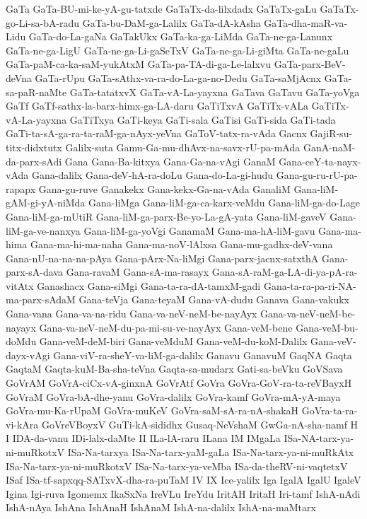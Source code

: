 {GaTa
GaTa-BU-mi-ke-yA-gu-tatxde
GaTaTx-da-lilxdadx
GaTaTx-gaLu
GaTaTx-go-Li-sa-bA-radu
GaTa-bu-DaM-ga-Lalilx
GaTa-dA-kAsha
GaTa-dha-maR-va-Lidu
GaTa-do-La-gaNa
GaTakUkx
GaTa-ka-ga-LiMda
GaTa-ne-ga-Lanunx
GaTa-ne-ga-LigU
GaTa-ne-ga-Li-gaSeTxV
GaTa-ne-ga-Li-giMta
GaTa-ne-gaLu
GaTa-paM-ca-ka-saM-yukAtxM
GaTa-pa-TA-di-ga-Le-lalxvu
GaTa-parx-BeV-deVna
GaTa-rUpu
GaTa-sAthx-va-ra-do-La-ga-no-Dedu
GaTa-saMjAcnx
GaTa-sa-paR-naMte
GaTa-tatatxvX
GaTa-vA-La-yayxna
GaTava
GaTavu
GaTa-yoVga
GaTf
GaTf-sathx-la-barx-himx-ga-LA-daru
GaTiTxvA
GaTiTx-vALa
GaTiTx-vA-La-yayxna
GaTiTxya
GaTi-keya
GaTi-sala
GaTisi
GaTi-sida
GaTi-tada
GaTi-ta-sA-ga-ra-ta-raM-ga-nAyx-yeVna
GaToV-tatx-ra-vAda
Gacnx
GajiR-su-titx-didxtutx
Galilx-suta
Gamu-Ga-mu-dhAvx-na-savx-rU-pa-mAda
GanA-naM-da-parx-sAdi
Gana
Gana-Ba-kitxya
Gana-Ga-na-vAgi
GanaM
Gana-ceY-ta-nayx-vAda
Gana-dalilx
Gana-deV-hA-ra-doLu
Gana-do-La-gi-hudu
Gana-gu-ru-rU-pa-rapapx
Gana-gu-ruve
Ganakekx
Gana-kekx-Ga-na-vAda
GanaliM
Gana-liM-gAM-gi-yA-niMda
Gana-liMga
Gana-liM-ga-ca-karx-veMdu
Gana-liM-ga-do-Lage
Gana-liM-ga-mUtiR
Gana-liM-ga-parx-Be-yo-La-gA-yata
Gana-liM-gaveV
Gana-liM-ga-ve-nanxya
Gana-liM-ga-yoVgi
GanamaM
Gana-ma-hA-liM-gavu
Gana-ma-hima
Gana-ma-hi-ma-naha
Gana-ma-noV-lAlxsa
Gana-mu-gadhx-deV-vana
Gana-nU-na-na-na-pAya
Gana-pArx-Na-liMgi
Gana-parx-jacnx-satxthA
Gana-parx-sA-dava
Gana-ravaM
Gana-sA-ma-rasayx
Gana-sA-raM-ga-LA-di-ya-pA-ra-vitAtx
Ganashacx
Gana-siMgi
Gana-ta-ra-dA-tamxM-gadi
Gana-ta-ra-pa-ri-NA-ma-parx-sAdaM
Gana-teVja
Gana-teyaM
Gana-vA-dudu
Ganava
Gana-vakukx
Gana-vana
Gana-va-na-ridu
Gana-va-neV-neM-be-nayAyx
Gana-va-neV-neM-be-nayayx
Gana-va-neV-neM-du-pa-mi-su-ve-nayAyx
Gana-veM-bene
Gana-veM-bu-doMdu
Gana-veM-deM-biri
Gana-veMduM
Gana-veM-du-koM-Dalilx
Gana-veV-dayx-vAgi
Gana-viV-ra-sheY-va-liM-ga-dalilx
Ganavu
GanavuM
GaqNA
Gaqta
GaqtaM
Gaqta-kuM-Ba-sha-teVna
Gaqta-sa-mudarx
Gati-sa-beVku
GoVSava
GoVrAM
GoVrA-ciCx-vA-ginxnA
GoVrAtf
GoVra
GoVra-GoV-ra-ta-reVBayxH
GoVraM
GoVra-bA-dhe-yanu
GoVra-dalilx
GoVra-kamf
GoVra-mA-yA-maya
GoVra-mu-Ka-rUpaM
GoVra-muKeV
GoVra-saM-sA-ra-nA-shakaH
GoVra-ta-ra-vi-kAra
GoVreVBoyxV
GuTi-kA-sididhx
Gusaq-NeVshaM
GwGa-nA-sha-namf
H
I
IDA-da-vanu
IDi-lalx-daMte
II
ILa-lA-raru
ILana
IM
IMgaLa
ISa-NA-tarx-ya-ni-muRkotxV
ISa-Na-tarxya
ISa-Na-tarx-yaM-gaLa
ISa-Na-tarx-ya-ni-muRkAtx
ISa-Na-tarx-ya-ni-muRkotxV
ISa-Na-tarx-ya-veMba
ISa-da-theRV-ni-vaqtetxV
ISaf
ISa-tf-sapxqq-SATxvX-dha-ra-puTaM
IV
IX
Ice-yalilx
Iga
IgalA
IgalU
IgaleV
Igina
Igi-ruva
Igomemx
IkaSxNa
IreVLu
IreYdu
IritAH
IritaH
Iri-tamf
IshA-nAdi
IshA-nAya
IshAna
IshAnaH
IshAnaM
IshA-na-dalilx
IshA-na-maMtarx
}
